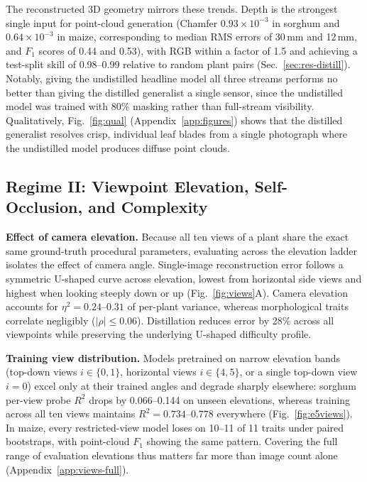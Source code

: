 \documentclass[10pt,twocolumn,letterpaper]{article}
\begin{document}
The reconstructed 3D geometry mirrors these trends. Depth is the strongest single input for point-cloud generation (Chamfer $0.93 \times 10^{-3}$ in sorghum and $0.64 \times 10^{-3}$ in maize, corresponding to median RMS errors of 30\,mm and 12\,mm, and $F_1$ scores of 0.44 and 0.53), with RGB within a factor of 1.5 and achieving a test-split skill of 0.98--0.99 relative to random plant pairs (Sec.~\ref{sec:res-distill}). Notably, giving the undistilled headline model all three streams performs no better than giving the distilled generalist a single sensor, since the undistilled model was trained with 80\% masking rather than full-stream visibility. Qualitatively, Fig.~\ref{fig:qual} (Appendix~\ref{app:figures}) shows that the distilled generalist resolves crisp, individual leaf blades from a single photograph where the undistilled model produces diffuse point clouds.

\subsection{Regime II: Viewpoint Elevation, Self-Occlusion, and Complexity}
\label{sec:regime2}\label{sec:exp-regime2}

\noindent\textbf{Effect of camera elevation.}
Because all ten views of a plant share the exact same ground-truth procedural parameters, evaluating across the elevation ladder isolates the effect of camera angle. Single-image reconstruction error follows a symmetric U-shaped curve across elevation, lowest from horizontal side views and highest when looking steeply down or up (Fig.~\ref{fig:views}A). Camera elevation accounts for $\eta^2 = 0.24\text{--}0.31$ of per-plant variance, whereas morphological traits correlate negligibly ($|\rho| \le 0.06$). Distillation reduces error by 28\% across all viewpoints while preserving the underlying U-shaped difficulty profile.

\noindent\textbf{Training view distribution.}
Models pretrained on narrow elevation bands (top-down views $i \in \{0,1\}$, horizontal views $i \in \{4,5\}$, or a single top-down view $i=0$) excel only at their trained angles and degrade sharply elsewhere: sorghum per-view probe $R^2$ drops by 0.066--0.144 on unseen elevations, whereas training across all ten views maintains $R^2 = 0.734\text{--}0.778$ everywhere (Fig.~\ref{fig:e5views}). In maize, every restricted-view model loses on 10--11 of 11 traits under paired bootstraps, with point-cloud $F_1$ showing the same pattern. Covering the full range of evaluation elevations thus matters far more than image count alone (Appendix~\ref{app:views-full}).
\end{document}
